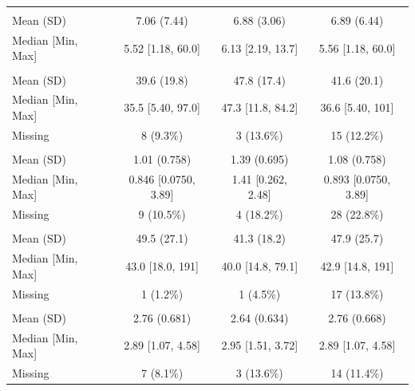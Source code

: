 \documentclass[]{article}
\begin{document}
\begin{tabular}{lccc}
\addlinespace[0.3em]
\multicolumn{4}{l}{\textbf{SOCPSA}}\\
\hspace{1em}Mean (SD) & 7.06 (7.44) & 6.88 (3.06) & 6.89 (6.44)\\
\hspace{1em}Median [Min, Max] & 5.52 [1.18, 60.0] & 6.13 [2.19, 13.7] & 5.56 [1.18, 60.0]\\
\addlinespace[0.3em]
\multicolumn{4}{l}{\textbf{PHI}}\\
\hspace{1em}Mean (SD) & 39.6 (19.8) & 47.8 (17.4) & 41.6 (20.1)\\
\hspace{1em}Median [Min, Max] & 35.5 [5.40, 97.0] & 47.3 [11.8, 84.2] & 36.6 [5.40, 101]\\
\hspace{1em}Missing & 8 (9.3\%) & 3 (13.6\%) & 15 (12.2\%)\\
\addlinespace[0.3em]
\multicolumn{4}{l}{\textbf{PHIDensity}}\\
\hspace{1em}Mean (SD) & 1.01 (0.758) & 1.39 (0.695) & 1.08 (0.758)\\
\hspace{1em}Median [Min, Max] & 0.846 [0.0750, 3.89] & 1.41 [0.262, 2.48] & 0.893 [0.0750, 3.89]\\
\hspace{1em}Missing & 9 (10.5\%) & 4 (18.2\%) & 28 (22.8\%)\\
\addlinespace[0.3em]
\multicolumn{4}{l}{\textbf{Prostate Volume (cm\textasciicircum{}3)}}\\
\hspace{1em}Mean (SD) & 49.5 (27.1) & 41.3 (18.2) & 47.9 (25.7)\\
\hspace{1em}Median [Min, Max] & 43.0 [18.0, 191] & 40.0 [14.8, 79.1] & 42.9 [14.8, 191]\\
\hspace{1em}Missing & 1 (1.2\%) & 1 (4.5\%) & 17 (13.8\%)\\
\addlinespace[0.3em]
\multicolumn{4}{l}{\textbf{TNFaAverage}}\\
\hspace{1em}Mean (SD) & 2.76 (0.681) & 2.64 (0.634) & 2.76 (0.668)\\
\hspace{1em}Median [Min, Max] & 2.89 [1.07, 4.58] & 2.95 [1.51, 3.72] & 2.89 [1.07, 4.58]\\
\hspace{1em}Missing & 7 (8.1\%) & 3 (13.6\%) & 14 (11.4\%)\\
\bottomrule
\end{tabular}
\end{document}
